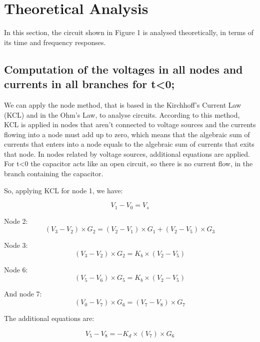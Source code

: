 \section{Theoretical Analysis}
\label{sec:analysis}

In this section, the circuit shown in Figure 1 is analysed
theoretically, in terms of its time and frequency responses. 

\subsection{Computation of the voltages in all nodes and currents in all branches for t\textless 0;}

We can apply the node method, that is based in the Kirchhoff's Current Law (KCL) and in the Ohm's Law, to analyse circuits. According to this method, KCL is applied in nodes that aren't connected to voltage sources and the currents flowing into a node must add up to zero, which means that the algebraic sum of currents that enters into a node equals to the algebraic sum of currents that exits that node. In nodes related by voltage sources, additional equations are applied. 
For t\textless0 the capacitor acts like an open circuit, so there is no current flow, in the branch containing the capacitor.\par
\par
So, applying KCL for node 1, we have: 

\begin {equation}
V_1 - V_0= V_s
\end{equation}

Node 2:
\begin {equation}
  (V_3 - V_2)\times G_2 = (V_2 - V_1)\times G_1 + (V_2 - V_5)\times G_3
\end{equation}

Node 3:
\begin{equation}
(V_3- V_2)\times G_2 = K_b\times (V_2 - V_5)
\end{equation}

Node 6:
\begin {equation}
(V_5 - V_6)\times G_5 = K_b\times (V_2 - V_5)
\end{equation}

And node 7:
\begin {equation}
(V_0-V_7)\times G_6 = (V_7 - V_8)\times G_7
\end{equation}

The additional equations are:

\begin {equation}
V_5 - V_8 = -K_d\times (V_7)\times G_6
\end{equation}

